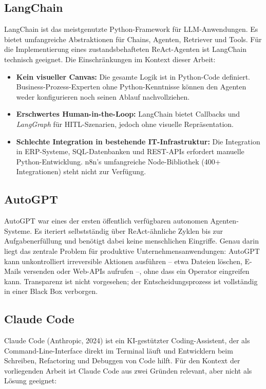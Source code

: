 \documentclass[12pt,a4paper,oneside]{report}
\begin{document}
\subsection{LangChain}

LangChain ist das meistgenutzte Python-Framework für \ac{LLM}-Anwendungen. Es bietet
umfangreiche Abstraktionen für Chains, Agenten, Retriever und Tools. Für die
Implementierung eines zustandsbehafteten ReAct-Agenten ist LangChain technisch
geeignet. Die Einschränkungen im Kontext dieser Arbeit:

\begin{itemize}
  \item \textbf{Kein visueller Canvas:} Die gesamte Logik ist in Python-Code
    definiert. Business-Prozess-Experten ohne Python-Kenntnisse können den Agenten
    weder konfigurieren noch seinen Ablauf nachvollziehen.
  \item \textbf{Erschwertes Human-in-the-Loop:} LangChain bietet Callbacks und
    \textit{LangGraph} für HITL-Szenarien, jedoch ohne visuelle Repräsentation.
  \item \textbf{Schlechte Integration in bestehende IT-Infrastruktur:} Die Integration
    in ERP-Systeme, SQL-Datenbanken und REST-\ac{API}s erfordert manuelle Python-Entwicklung.
    n8n's umfangreiche Node-Bibliothek (400+ Integrationen) steht nicht zur Verfügung.
\end{itemize}

\subsection{AutoGPT}

AutoGPT war eines der ersten öffentlich verfügbaren autonomen Agenten-Systeme. Es
iteriert selbstständig über ReAct-ähnliche Zyklen bis zur Aufgabenerfüllung und benötigt
dabei keine menschlichen Eingriffe. Genau darin liegt das zentrale Problem für
produktive Unternehmensanwendungen: AutoGPT kann unkontrolliert irreversible Aktionen
ausführen -- etwa Dateien löschen, E-Mails versenden oder Web-\ac{API}s aufrufen --,
ohne dass ein Operator eingreifen kann. Transparenz ist nicht vorgesehen; der
Entscheidungsprozess ist vollständig in einer Black Box verborgen.

\subsection{Claude Code}

Claude Code (Anthropic, 2024) ist ein KI-gestützter Coding-Assistent, der als
Command-Line-Interface direkt im Terminal läuft und Entwicklern beim Schreiben,
Refactoring und Debuggen von Code hilft. Für den Kontext der vorliegenden Arbeit
ist Claude Code aus zwei Gründen relevant, aber nicht als Lösung geeignet:
\end{document}
